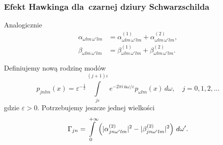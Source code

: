 \documentclass[10pt,t]{beamer}
\begin{document}
\begin{frame}
  \frametitle{Efekt Hawkinga dla~czarnej dziury Schwarzschilda}


  Analogicznie
  \begin{subequations}
    \begin{align}
      \label{eq:Promieniowanie-Hawkinga-26}
      \alpha_{ \omega l m\, \omega' l m }
      &= \alpha_{ \omega l m\, \omega' l m }^{ ( 1 ) }
        + \alpha_{ \omega l m\, \omega' l m }^{ ( 2 ) }, \\
      \beta_{ \omega l m\, \omega' l m }
      &= \beta_{ \omega l m\, \omega' l m }^{ ( 1 ) }
        + \beta_{ \omega l m\, \omega' l m }^{ ( 2 ) }.
    \end{align}
  \end{subequations}

  Definiujemy nową rodzinę modów \\
  \begin{equation}
    \label{eq:Promieniowanie-Hawkinga-27}
    p_{ j n l m }( x ) =
    \varepsilon^{ -\frac{ 1 }{ 2 } } \int\limits_{ j \varepsilon }^{ ( j + 1 ) \varepsilon }
    e^{ -2 \pi i \, \mathrm{n} \omega / \varepsilon } p_{ \omega l m }( x ) \, d \omega, \quad
    j = 0, 1, 2, \ldots
  \end{equation}
  gdzie $\varepsilon > 0$. Potrzebujemy jeszcze jednej wielkości
  \begin{equation}
    \label{eq:Promieniowanie-Hawkinga-28}
    \Gamma_{ j n } =
    \int\limits_{ 0 }^{ +\infty }
    \left( \lvert{  \alpha_{ j n \omega' l m }^{ ( 2 ) }  }\rvert^{ 2 }
      - \lvert{  \beta_{ j n \omega' l m }^{ ( 2 ) }  }\rvert^{ 2 } \right) \,
    d \omega'.
  \end{equation}

\end{frame}
\end{document}

